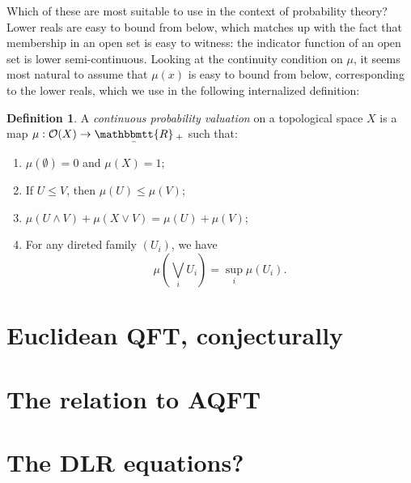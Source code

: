 \documentclass[11pt, oneside, article]{memoir}
\theoremstyle{plain}
\theoremstyle{definition}
\newtheorem{definition}[theorem]{Definition}
\theoremstyle{remark}
\newcommand{\ubar}[1]{\underaccent{\bar}{#1}}
\newcommand{\internal}[1]{\raisebox{-.03ex}{$\mathbbmtt{#1}$}}
\newcommand{\hs}{\hspace{1.1pt}}
\newcommand{\tRR}{\internal{R}\hs}
\newcommand{\tLR}{\ubar{\tRR}\hs}
\begin{document}
Which of these are most suitable to use in the context of probability theory? Lower reals are easy to bound from below, which matches up with the fact that membership in an open set is easy to witness: the indicator function of an open set is lower semi-continuous. Looking at the continuity condition on $\mu$, it seems most natural to assume that $\mu(x)$ is easy to bound from below, corresponding to the lower reals, which we use in the following internalized definition:

\begin{definition}
A \emph{continuous probability valuation} on a topological space $X$ is a map $\mu : \Open{X} \to \tLR_+$ such that:
\begin{enumerate}
\item $\mu(\emptyset) = 0$ and $\mu(X) = 1$;
\item If $U\leq V$, then $\mu(U) \leq \mu(V)$;
\item $\mu(U \land V) + \mu(X \lor V) = \mu(U) + \mu(V)$;
\item For any direted family $(U_i)$, we have
\[
	\mu\left( \bigvee_i U_i \right) = \sup_i \mu(U_i).
\]
\end{enumerate}
\end{definition}

\chapter{Euclidean QFT, conjecturally}


\chapter{The relation to AQFT}

\chapter{The DLR equations?}

\printbibliography
\end{document}
